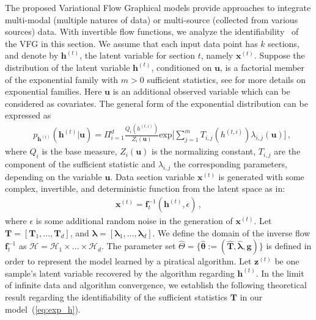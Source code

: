 \documentclass[twoside]{article}
\begin{document}
The proposed Variational Flow Graphical models provide approaches to integrate multi-modal (multiple natures of data) or multi-source (collected from various sources) data. 
With invertible flow functions, we analyze the identifiability~\cite{Khemakhem20a,Sorrenson2020} of the VFG in this section.  
We assume that each input data point has $k$ sections, and denote by $\mathbf{h}^{(t)}$, the latent variable for section $t$, namely $\mathbf{x}^{(t)}$. 
Suppose the distribution of the latent variable $\mathbf{h}^{(t)}$, conditioned on $\mathbf{u}$, is a factorial member of the exponential family with $m > 0$ sufficient statistics, see \cite{efron1975defining} for more details on exponential families. 
Here $\mathbf{u}$ is an additional observed variable which can be considered as covariates.
The general form of the exponential distribution can be expressed as 
\begin{equation}\label{eq:exp_h}
\begin{split}
&p_{\mathbf{h}^{(t)}}(\mathbf{h}^{(t)} | \mathbf{u})  = \Pi_{i=1}^d \frac{Q_i(h^{(t,i)})}{Z_i(\mathbf{u})} \text{exp}\bigg[ \sum_{j=1}^m T_{i,j}(h^{(t,i)}) \lambda_{i,j}(\mathbf{u}) \bigg]\, ,
\end{split}
\end{equation} 
where $Q_i$ is the base measure, $Z_i(\mathbf{u})$ is the normalizing constant, $T_{i,j}$ are the component of the sufficient statistic and $\lambda_{i,j}$ the corresponding parameters, depending on the variable $\mathbf{u}$. 
Data section variable $\mathbf{x}^{(t)}$ is generated with some complex, invertible, and deterministic function from the latent space as in: 
\begin{align}\label{eq:xt_gen}
\mathbf{x}^{(t)} = \mathbf{f}^{-1}_t(\mathbf{h}^{(t)}, \epsilon)\, ,
\end{align}
where $\epsilon$ is some additional random noise in the generation of $\mathbf{x}^{(t)}$. 
Let $\mathbf{T} =[\mathbf{T}_1, ..., \mathbf{T}_d] $, and $\mathbf{\lambda} =[\mathbf{\lambda}_1, ..., \mathbf{\lambda}_d]$.  
 We define the domain of the inverse flow $\mathbf{f}_t^{-1}$ as $\mathcal{H}=\mathcal{H}_1 \times ... \times \mathcal{H}_d$.
The parameter set $\widehat{\Theta} = \{\widehat{\mathbf{\theta}} := (\widehat{\mathbf{T}}, \widehat{\mathbf{\lambda}}, \mathbf{g} ) \}$ is defined in order to represent the model learned by a piratical algorithm. Let $\mathbf{z}^{(t)}$ be one sample's latent variable recovered by the algorithm regarding $\mathbf{h}^{(t)}$.
In the limit of infinite data and algorithm convergence, we establish the following theoretical result regarding the identifiability of the sufficient statistics $\mathbf{T}$ in our model~(\ref{eq:exp_h}).
\end{document}
